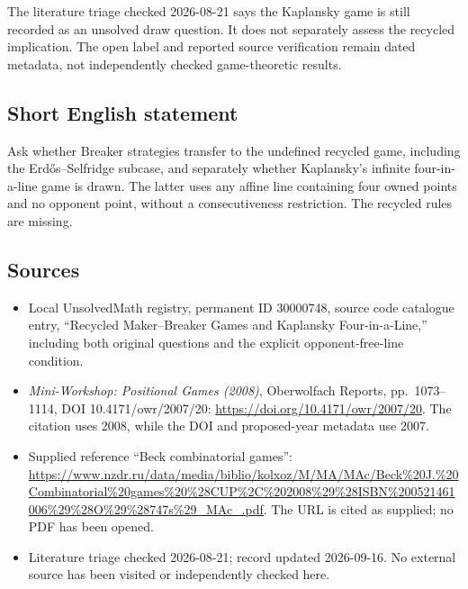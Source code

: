 \documentclass[11pt]{article}
\begin{document}
The literature triage checked 2026-08-21 says the Kaplansky game is still recorded as an unsolved draw question. It does not separately assess the recycled implication. The open label and reported source verification remain dated metadata, not independently checked game-theoretic results.
\subsection{Short English statement}
Ask whether Breaker strategies transfer to the undefined recycled game, including the Erd\H{o}s--Selfridge subcase, and separately whether Kaplansky's infinite four-in-a-line game is drawn. The latter uses any affine line containing four owned points and no opponent point, without a consecutiveness restriction. The recycled rules are missing.
\subsection{Sources}
\begin{itemize}
\item Local UnsolvedMath registry, permanent ID 30000748, source code catalogue entry, ``Recycled Maker--Breaker Games and Kaplansky Four-in-a-Line,'' including both original questions and the explicit opponent-free-line condition.
\item \emph{Mini-Workshop: Positional Games (2008)}, Oberwolfach Reports, pp.\ 1073--1114, DOI 10.4171/owr/2007/20: \url{https://doi.org/10.4171/owr/2007/20}. The citation uses 2008, while the DOI and proposed-year metadata use 2007.
\item Supplied reference ``Beck combinatorial games'': \url{https://www.nzdr.ru/data/media/biblio/kolxoz/M/MA/MAc/Beck%20J.%20Combinatorial%20games%20%28CUP%2C%202008%29%28ISBN%200521461006%29%28O%29%28747s%29_MAc_.pdf}. The URL is cited as supplied; no PDF has been opened.
\item Literature triage checked 2026-08-21; record updated 2026-09-16. No external source has been visited or independently checked here.
\end{itemize}
\end{document}

